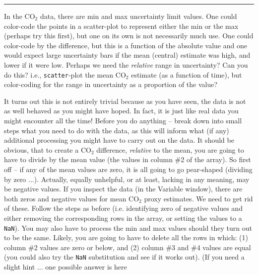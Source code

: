 \documentclass{tufte-book} %
\begin{document}
\vspace{1mm}
\noindent\rule{4cm}{0.5pt}

 \noindent In the CO\(_{2}\) data, there are min and max uncertainty limit values. One could color-code the points in a scatter-plot to represent either the min or the max (perhaps try this first), but one on its own is not necessarily much use. One could color-code by the difference, but this is a function of the absolute value and one would expect large uncertainty bars if the mean (central) estimate was high, and lower if it were low. Perhaps we need the \textit{relative} range in uncertainty? Can you do this? i.e., \texttt{scatter}-plot the mean CO\(_{2}\) estimate (as a function of time), but color-coding for the range in uncertainty as a proportion of the value?

It turns out this is not entirely trivial because as you have seen, the data is not as well behaved as you might have hoped. In fact, it is just like real data you might encounter all the time! Before you do anything -- break down into small steps what you need to do with the data, as this will inform what (if any) additional processing you might have to carry out on the data. It should be obvious, that to create a CO\(_{2}\) difference, \textit{relative} to the mean, you are going to have to divide by the mean value (the values in column \#2 of the array).  So first off -- if any of the mean values are zero, it is all going to go pear-shaped (dividing by zero ...). Actually, equally unhelpful, or at least, lacking in any meaning, may be negative values. If you inspect the data (in the \textsf{Variable window}), there are both zeros and negative values for mean CO\(_{2}\) proxy estimates. We need to get rid of these. Follow the steps as before (i.e. identifying zero of negative values and either removing the corresponding rows in the array, or setting the values to a \texttt{NaN}). You may also have to process the min and max values should they turn out to be the same. Likely, you are going to have to delete all the rows in which: (1) column \#2 values are zero or below, and (2) column \#3 and \#4 values are equal (you could also try the \texttt{NaN} substitution and see if it works out).
(If you need a slight hint ... one possible answer is here
\end{document}
